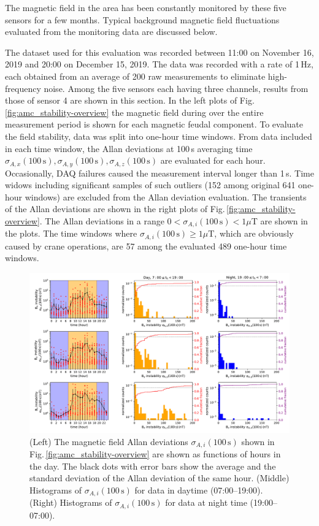 The magnetic field in the area has been constantly monitored by these five sensors for a few months.  Typical background magnetic field fluctuations evaluated from the monitoring data are discussed below. 
 
 The dataset used for this evaluation was recorded between 11:00 on November 16, 2019 and 20:00 on December 15, 2019. The data was recorded with a rate of 1\,Hz, each obtained from an average of 200 raw measurements to eliminate high-frequency noise. Among the five sensors each having three channels, results from those of sensor 4 are shown in this section.   In the left plots of Fig.\,\ref{fig:amc_stability-overview} the magnetic field during over the entire measurement period is shown for each magnetic feudal component. To evaluate the field stability, data was split into one-hour time windows. From data included in each time window, the Allan deviations at 100\,s averaging time $\sigma_{A,x}(100\,\mathrm{s}), \sigma_{A,y}(100\,\mathrm{s}), \sigma_{A,z}(100\,\mathrm{s})$ are evaluated for each hour. Occasionally,  DAQ failures caused the measurement interval longer than 1\,s. Time widows including significant samples of such outliers (152 among original 641 one-hour windows) are excluded from the Allan deviation evaluation. 
The transients of the Allan deviations are shown in the right plots of Fig.\,\ref{fig:amc_stability-overview}.  The Allan deviations in a range $0<\sigma_{A,i} (100\,\mathrm{s})<1\mu$T are shown in the plots. The time windows  where $\sigma_{A,i} (100\,\mathrm{s})\geq 1\mu$T, which are obviously caused by crane operations,  are 57 among the evaluated 489 one-hour  time windows. 
 
\begin{figure}[tbp]
\centering 
\includegraphics[width=.98\textwidth]{graphics/AMC/stability_day_night_f3_100s.pdf}
\caption{(Left) The magnetic field Allan deviations $\sigma_{A,i}(100\,\mathrm{s})$  shown in Fig.\,\ref{fig:amc_stability-overview} are shown as functions of hours in the day. The black dots with error bars show the average and the standard deviation of the Allan deviation of the same hour. 
(Middle) Histograms of  $\sigma_{A,i}(100\,\mathrm{s})$  for data in  daytime (07:00--19:00). (Right) Histograms of  $\sigma_{A,i}(100\,\mathrm{s})$  for data at night time  (19:00--07:00). }
\label{fig:amc_stability-day-night}
\end{figure}

